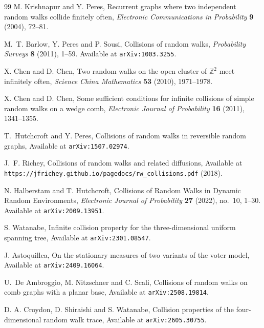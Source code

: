 \documentclass[10pt,twoside]{article}
\begin{document}
\begin{thebibliography}{99}
M. Krishnapur and Y. Peres,
\newblock Recurrent graphs where two independent random walks collide finitely often,
\newblock \emph{Electronic Communications in Probability} \textbf{9} (2004), 72--81.

M.~T. Barlow, Y. Peres and P. Sousi,
\newblock Collisions of random walks,
\newblock \emph{Probability Surveys} \textbf{8} (2011), 1--59.
\newblock Available at \texttt{arXiv:1003.3255}.

X. Chen and D. Chen,
\newblock Two random walks on the open cluster of $\mathbb{Z}^2$ meet infinitely often,
\newblock \emph{Science China Mathematics} \textbf{53} (2010), 1971--1978.

X. Chen and D. Chen,
\newblock Some sufficient conditions for infinite collisions of simple random walks on a wedge comb,
\newblock \emph{Electronic Journal of Probability} \textbf{16} (2011), 1341--1355.

T.~Hutchcroft and Y. Peres,
\newblock Collisions of random walks in reversible random graphs,
\newblock Available at \texttt{arXiv:1507.02974}.

J.~F. Richey,
\newblock Collisions of random walks and related diffusions,
\newblock Available at \texttt{https://jfrichey.github.io/pagedocs/rw\_collisions.pdf} (2018).

N. Halberstam and T. Hutchcroft,
\newblock Collisions of Random Walks in Dynamic Random Environments,
\newblock \emph{Electronic Journal of Probability} \textbf{27} (2022), no.~10, 1--30.
\newblock Available at \texttt{arXiv:2009.13951}.

S. Watanabe,
\newblock Infinite collision property for the three-dimensional uniform spanning tree,
\newblock Available at \texttt{arXiv:2301.08547}.

J. Astoquillca,
\newblock On the stationary measures of two variants of the voter model,
\newblock Available at \texttt{arXiv:2409.16064}.

U.~De Ambroggio, M. Nitzschner and C. Scali,
\newblock Collisions of random walks on comb graphs with a planar base,
\newblock Available at \texttt{arXiv:2508.19814}.

D. A. Croydon, D. Shiraishi and S. Watanabe,
\newblock Collision properties of the four-dimensional random walk trace,
\newblock Available at \texttt{arXiv:2605.30755}.


\end{thebibliography}
\end{document}

